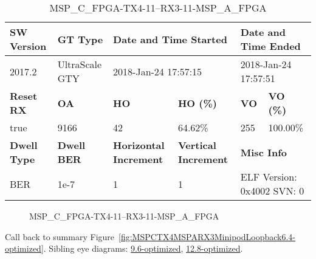 \begin{table}[h]
\centering
\caption{MSP\_C\_FPGA-TX4-11--RX3-11-MSP\_A\_FPGA}
\label{tab:MSPCFPGATX411RX311MSPAFPGA6.4-optimized}
\begin{tabular}{@{}|l|l|l|l|l|l|@{}}
\toprule
\textbf{SW Version}                & \textbf{GT Type}   & \multicolumn{2}{l|}{\textbf{Date and Time Started}}            & \multicolumn{2}{l|}{\textbf{Date and Time Ended}}        \\ \midrule
2017.2                       & UltraScale GTY          & \multicolumn{2}{l|}{2018-Jan-24 17:57:15}                   & \multicolumn{2}{l|}{2018-Jan-24 17:57:51}               \\ \midrule
\textbf{Reset RX}                  & \textbf{OA} & \textbf{HO}   & \textbf{HO (\%)} & \textbf{VO} & \textbf{VO (\%)} \\ \midrule
true & 9166        & 42          & 64.62\%        & 255        & 100.00\%       \\ \midrule
\textbf{Dwell Type}                & \textbf{Dwell BER} & \textbf{Horizontal Increment} & \textbf{Vertical Increment}    & \multicolumn{2}{l|}{\textbf{Misc Info}}                  \\ \midrule
BER                            & 1e-7        & 1        & 1           & \multicolumn{2}{l|}{ELF Version: 0x4002 SVN: 0}                         \\ \bottomrule
\end{tabular}
\end{table}

\begin{figure}[h]
\caption{MSP\_C\_FPGA-TX4-11--RX3-11-MSP\_A\_FPGA} \label{fig:MSPCFPGATX411RX311MSPAFPGA6.4-optimized}
\end{figure}

Call back to summary Figure~\ref{fig:MSPCTX4MSPARX3MinipodLoopback6.4-optimized}.
Sibling eye diagrams: \hyperref[sec:MSPCFPGATX411RX311MSPAFPGA9.6-optimized]{9.6-optimized}, \hyperref[sec:MSPCFPGATX411RX311MSPAFPGA12.8-optimized]{12.8-optimized}.

\clearpage
\newpage

